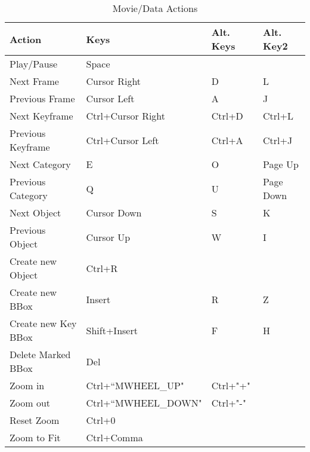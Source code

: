 \begin{table}[H]
   \caption{Movie/Data Actions}
   \label{movieactions}
   \begin{tabular}{|l|l|l|l|}
      \hline
      Action           & Keys & Alt. Keys & Alt. Key2 \\
      \hline
      Play/Pause       &      Space             &        &          \\
      Next Frame       &      Cursor Right 		& D 		&  L       \\
      Previous Frame   &      Cursor Left 		& A 		&  J       \\
      Next Keyframe    &      Ctrl+Cursor Right	& Ctrl+D	& Ctrl+L   \\
      Previous Keyframe&      Ctrl+Cursor Left 	& Ctrl+A &  Ctrl+J  \\
      Next Category    &      E 		            & O    	&  Page Up \\
      Previous Category&      Q 		            & U 	   &  Page Down\\
      Next Object      &      Cursor Down 		& S 		&  K       \\
      Previous Object  &      Cursor Up 		   & W 		&  I       \\
      Create new Object&      Ctrl+R            &        &          \\
      Create new BBox  &      Insert 		      & R 		&  Z       \\
      Create new Key BBox &   Shift+Insert 		& F 		&  H       \\
      Delete Marked BBox  &   Del               &        &          \\
      Zoom in          &      Ctrl+“MWHEEL\_UP" & Ctrl+"+"&          \\
      Zoom out         &      Ctrl+“MWHEEL\_DOWN"& Ctrl+"-"&          \\
      Reset Zoom       &      Ctrl+0            &        &          \\
      Zoom to Fit      &      Ctrl+Comma        &        &          \\
      \hline
   \end{tabular}
\end{table}


